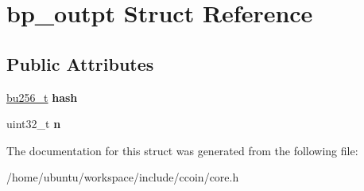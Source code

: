 \hypertarget{structbp__outpt}{\section{bp\-\_\-outpt Struct Reference}
\label{structbp__outpt}
}
\subsection*{Public Attributes}
\begin{DoxyCompactItemize}
\item 
\hypertarget{structbp__outpt_a4157dc1165d0fd0821b64bd711a4bee9}{\hyperlink{structbu256}{bu256\-\_\-t} {\bfseries hash}}\label{structbp__outpt_a4157dc1165d0fd0821b64bd711a4bee9}

\item 
\hypertarget{structbp__outpt_a8d3fcb7e9605b62c79b6c61a9e2eab4b}{uint32\-\_\-t {\bfseries n}}\label{structbp__outpt_a8d3fcb7e9605b62c79b6c61a9e2eab4b}

\end{DoxyCompactItemize}


The documentation for this struct was generated from the following file\-:\begin{DoxyCompactItemize}
\item 
/home/ubuntu/workspace/include/ccoin/core.\-h\end{DoxyCompactItemize}

